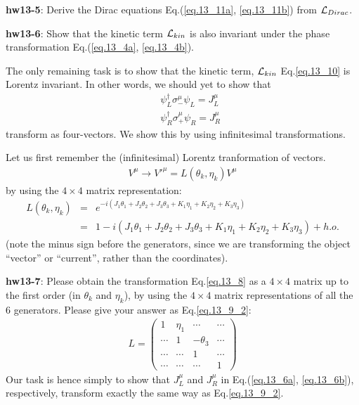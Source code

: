 \documentclass[12pt]{article}
\begin{document}
{\bf hw13-5}: Derive the Dirac equations Eq.(\ref{eq.13_11a}, \ref{eq.13_11b}) from ${\cal L}_{Dirac}$.

{\bf hw13-6}: Show that the kinetic term ${\cal L}_{kin}$ is also invariant
  under the phase transformation Eq.(\ref{eq.13_4a}, \ref{eq.13_4b}).

  The only remaining task is to show that the kinetic term, ${\cal L}_{kin}$ Eq.\ref{eq.13_10}
  is Lorentz invariant.  In other words, we should yet to show that
\begin{eqnarray}
  && \psi_L^\dagger \sigma_-^\mu \psi_L = J_L^\mu \label{eq.13_6a} \\
  && \psi_R^\dagger \sigma_+^\mu \psi_R = J_R^\mu \label{eq.13_6b}
\end{eqnarray}
  transform as four-vectors. We show this by using infinitesimal
  transformations.

  Let us first remember the (infinitesimal) Lorentz tranformation of
  vectors.
\begin{eqnarray}
  V^\mu \to V'^\mu = L(\theta_k,\eta_k) V^\mu \label{eq.13_7}
\end{eqnarray}
  by using the $4 \times 4$ matrix representation:
\begin{eqnarray}
  L(\theta_k,\eta_k)
  &=& e^{-i( J_1 \theta_1 + J_2 \theta_2 + J_3 \theta_3
          +K_1 \eta_1   + K_2 \eta_2   + K_3 \eta_3  )} \\
  &=& 1  -i( J_1 \theta_1 + J_2 \theta_2 + J_3 \theta_3
          +K_1 \eta_1   + K_2 \eta_2   + K_3 \eta_3 ) + h.o. \label{eq.13_8}
\end{eqnarray}
  (note the minus sign before the generators, since we are transforming
  the object ``vector'' or ``current'', rather than the coordinates).

{\bf hw13-7}: Please obtain the transformation Eq.\ref{eq.13_8} as a $4 \times 4$ matrix up to
  the first order (in $\theta_k$ and $\eta_k$), by using the $4 \times 4$ matrix
  representations of all the $6$ generators.  Please give your answer
  as Eq.\ref{eq.13_9_2}:
\begin{eqnarray}
  L=
  \begin{pmatrix}
    1 & \eta_1 & \cdots & \cdots \\ 
    \cdots & 1 &-\theta_3 & \cdots \\
    \cdots & \cdots & 1 & \cdots \\
    \cdots & \cdots & \cdots & 1
  \end{pmatrix} \label{eq.13_9_2}
\end{eqnarray}
  Our task is hence simply to show that $J_L^\mu$ and $J_R^\mu$ in Eq.(\ref{eq.13_6a}, \ref{eq.13_6b}), 
  respectively, transform exactly the same way as Eq.\ref{eq.13_9_2}.
\end{document}
